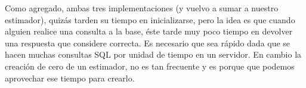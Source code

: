 Como agregado, ambas tres implementaciones (y vuelvo a sumar a nuestro estimador), quizás tarden su tiempo en inicializarse, pero la idea es que cuando alguien realice una consulta a la base, éste tarde muy poco tiempo en devolver una respuesta que considere correcta. Es necesario que sea rápido dada que se hacen muchas consultas SQL por unidad de tiempo en un servidor. En cambio la creación de cero de un estimador, no es tan frecuente y es porque que podemos aprovechar ese tiempo para crearlo. 




